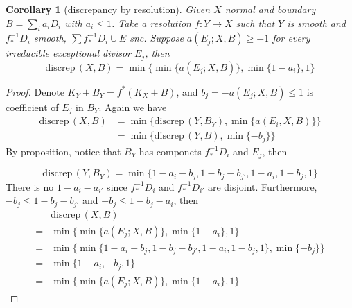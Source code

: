 \documentclass{article}
\newtheorem{cor}[defn]{Corollary}
\begin{document}
\begin{cor}[discrepancy by resolution]
  Given  $ X $ normal and boundary $ B=\sum_ia_iD_i $ with $ a_i\leqslant 1 $. Take a resolution $ f:Y\to X $ such that $ Y $ is smooth and $ f^{-1}_*D_i $ smooth, $ \sum f^{-1}_*D_i \cup E$ snc. Suppose $ a(E_j;X,B)\geqslant -1 $ for every irreducible exceptional divisor $ E_j $, then
  \[ \mathrm{discrep}\, (X,B)=\min\{\min\{a(E_j;X,B)\},\min\{1-a_i\},1\} \]
\end{cor}
\begin{proof}
  Denote $ K_Y+B_Y=f^*(K_X+B) $, and $ b_j=-a(E_j;X,B)\leqslant 1 $ is coefficient of $ E_j $ in $ B_Y $. Again we have
  \begin{equation*}
    \begin{aligned}
      \mathrm{discrep}\,(X,B) & =\min\{ \mathrm{discrep}\,(Y,B_Y), \min\{a(E_i,X,B)\}\} \\
                              & =\min\{ \mathrm{discrep}\,(Y,B), \min\{-b_j\}\}
    \end{aligned}
  \end{equation*}
  By proposition,  notice that $ B_Y $ has componets $ f^{-1}_*D_i $ and $ E_j $, then

  \[ \mathrm{discrep}\,(Y,B_Y)=\min \{ 1-a_i-b_j, 1-b_j-b_{j'}, 1-a_i, 1-b_j,1 \} \]
  There is no $ 1-a_i-a_{i'} $ since $ f^{-1}_*D_i $ and $ f^{-1}_*D_{i'} $ are disjoint. Furthermore, $ -b_j\leqslant 1-b_j-b_{j'} $ and $ -b_j\leqslant 1-b_j-a_i $, then
  \begin{equation*}
    \begin{aligned}
        & \mathrm{discrep}\, (X,B)                                                  \\
      = & \min\{\min\{a(E_j;X,B)\},\min\{1-a_i\},1\}                                \\
      = & \min\{ \min \{ 1-a_i-b_j, 1-b_j-b_{j'}, 1-a_i, 1-b_j,1 \}, \min\{-b_j\}\} \\
      = & \min\{  1-a_i,-b_j,1 \}                                                   \\
      = & \min\{\min\{a(E_j;X,B)\},\min\{1-a_i\},1\}
    \end{aligned}
  \end{equation*}

\end{proof}
\end{document}
